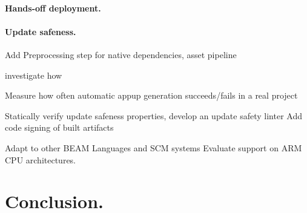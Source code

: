 \paragraph{Hands-off deployment.}


\paragraph{Update safeness.}

Add Preprocessing step for native dependencies, asset pipeline

investigate how


Measure how often automatic appup generation succeeds/fails in a real project

Statically verify update safeness properties, develop an update safety linter
Add code signing of built artifacts

Adapt to other BEAM Languages and SCM systems
Evaluate support on ARM CPU architectures.

\cleardoublepage
\section{Conclusion.}
